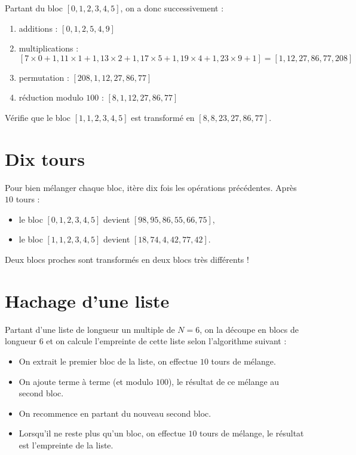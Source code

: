\documentclass[12pt,class=report,crop=false]{standalone}
\begin{document}


\newpage
\begin{minipage}{0.6\textwidth}  
  Partant du bloc $[0, 1, 2, 3, 4, 5]$, on a donc successivement :
   \begin{enumerate}
    \item additions : $[0, 1, 2, 5, 4, 9]$
    
    \item multiplications : $[7\times 0 + 1, 11\times 1+1, 13\times 2+1, 17 \times 5+1,19 \times  4+1, 23 \times 9+1] = [1,12,27,86,77,208]$ 
    
    \item permutation : $[208,1,12,27,86,77]$
    
    \item réduction modulo $100$ : $[8,1,12,27,86,77]$
  \end{enumerate}
  
   Vérifie que le bloc $[1, 1, 2, 3, 4, 5]$ est transformé en $[8, 8, 23, 27, 86, 77]$.
\end{minipage}\quad
\begin{minipage}{0.3\textwidth}
\end{minipage} 
 
 
\newpage

 
\section*{Dix tours} 
    
    Pour bien mélanger chaque bloc, itère dix fois les opérations précédentes.
    Après $10$ tours :
    \begin{itemize}
      \item le bloc $[0, 1, 2, 3, 4, 5]$ devient $[98, 95, 86, 55, 66, 75]$,
      \item le bloc $[1, 1, 2, 3, 4, 5]$ devient $[18, 74, 4, 42, 77, 42]$.
    \end{itemize}
 Deux blocs proches sont transformés en deux blocs très différents ! 
   
\newpage   
   
\section*{Hachage d'une liste} 
   
   Partant d'une liste de longueur un multiple de $N=6$, on la découpe en blocs de longueur $6$ et on calcule l'empreinte de cette liste selon l'algorithme suivant :
   \begin{itemize}
     \item On extrait le premier bloc de la liste, on effectue $10$ tours de mélange.
     \item On ajoute terme à terme (et modulo $100$), le résultat de ce mélange au second bloc.
     \item On recommence en partant du nouveau second bloc.
     \item Lorsqu'il ne reste plus qu'un bloc, on effectue $10$ tours de mélange, le résultat est l'empreinte de la liste.
   \end{itemize}
 
\end{document}
